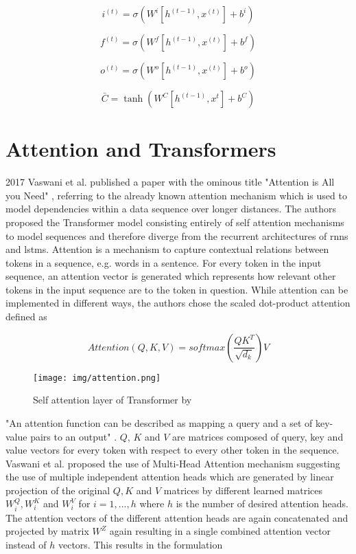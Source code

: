 \begin{equation}
i^{(t)} = \sigma(W^i[h^{(t-1)},x^{(t)}] + b^i)
\end{equation}

\begin{equation}
f^{(t)} = \sigma(W^f[h^{(t-1)},x^{(t)}] + b^f)
\end{equation}

\begin{equation}
o^{(t)} = \sigma(W^o[h^{(t-1)},x^{(t)}] + b^o)
\end{equation}

\begin{equation}
\bar{C}=\tanh(W^C[h^{(t-1)},x^{t}]+b^C)
\end{equation}

\section{Attention and Transformers}

2017 Vaswani et al. published a paper with the ominous title "Attention is All you Need" \cite{attention_origin}, referring to the already known attention mechanism which is used to model dependencies within a data sequence over longer distances. The authors proposed the Transformer model consisting entirely of self attention mechanisms to model sequences and therefore diverge from the recurrent architectures of \glspl{rnn} and \glspl{lstm}. Attention is a mechanism to capture contextual relations between tokens in a sequence, e.g. words in a sentence. For every token in the input sequence, an attention vector is generated which represents how relevant other tokens in the input sequence are to the token in question. While attention can be implemented in different ways, the authors chose the scaled dot-product attention defined as 

\begin{equation}
	Attention(Q,K,V) = softmax(\frac{QK^T}{\sqrt{d_k}})V
\end{equation}

\begin{figure}[h]
	\centering
	\texttt{[image: img/attention.png]}
	\caption{Self attention layer of Transformer by \cite{attention_origin}}
	\label{fig:attention}
\end{figure}

"An attention function can be described as mapping a query and a set of key-value pairs to an output" \cite{attention_origin}. $Q$, $K$ and $V$ are matrices composed of query, key and value vectors for every token with respect to every other token in the sequence.
Vaswani et al. proposed the use of Multi-Head Attention mechanism suggesting the use of multiple independent attention heads which are generated by linear projection of the original $Q, K$ and $V$ matrices by different learned matrices $W^Q_i, W^K_i$ and $W^V_i$ for $i = 1, ... ,h$ where $h$ is the number of desired attention heads. The attention vectors of the different attention heads are again concatenated and projected by matrix $W^Z$ again resulting in a single combined attention vector instead of $h$ vectors. This results in the formulation 

